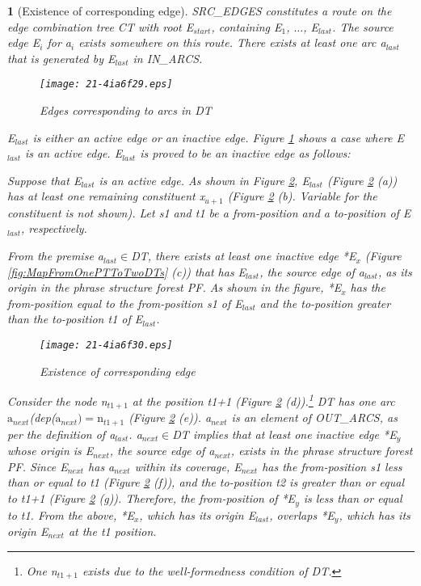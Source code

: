 \documentclass[english]{jnlp_1.4_rep}
\theoremstyle{break}
\theoremstyle{plain}
\newtheorem{lemma}{}[]
\theoremstyle{plain}
\begin{document}
\begin{lemma}[Existence of corresponding edge]
{\noindent
SRC\_EDGES constitutes a route on the edge combination tree CT with
root E$_{start}$, containing E$_1$, ${\ldots}$, E$_{last}$. The source
edge E$_i$ for a$_i$ exists somewhere on this route. There exists at
least one arc a$_{last}$ that is generated by E$_{last}$ in IN\_ARCS.

\begin{figure}[b]
 \begin{center}
\texttt{[image: 21-4ia6f29.eps]}
 \end{center}
\caption{Edges corresponding to arcs in DT}
\label{fig:CorrespondenceDT2Edge}
\end{figure}

E$_{last}$ is either an active edge or an inactive
edge. Figure \ref{fig:CorrespondenceDT2Edge} shows a case where
E$_{last}$ is an active edge. E$_{last}$ is proved to be an inactive
edge as follows:

Suppose that E$_{last}$ is an active edge. As shown in
Figure \ref{fig:ActiveEdgeLast}, E$_{last}$ (Figure \ref{fig:ActiveEdgeLast}
(a)) has at least one remaining constituent x$_{u+1}$
(Figure \ref{fig:ActiveEdgeLast} (b). Variable for the constituent is not
shown). Let s1 and t1 be a from-position and a to-position of
E$_{last}$, respectively.

From the premise a$_{last}{\in}$DT, there exists at least one inactive
edge *E$_x$ (Figure \ref{fig:MapFromOnePTToTwoDTs} (c)) that has
E$_{last}$, the source edge of a$_{last}$, as its origin in the phrase
structure forest PF. As shown in the figure, *E$_x$ has the
from-position equal to the from-position s1 of E$_{last}$ and the
to-position greater than the to-position t1 of E$_{last}$.

\begin{figure}[t]
 \begin{center}
\texttt{[image: 21-4ia6f30.eps]}
 \end{center}
\caption{Existence of corresponding edge}
\label{fig:ActiveEdgeLast}
\end{figure}

Consider the node n$_{t1+1}$ at the position t1+1
(Figure \ref{fig:ActiveEdgeLast} (d)).\footnote{One n$_{t1+1}$ exists due
  to the well-formedness condition of DT.} DT has one arc
\linebreak
$\mathrm{a}_\mathit{next}$(dep($\mathrm{a}_\mathit{next})=\mathrm{n}_{t1+1}$ (Figure \ref{fig:ActiveEdgeLast}
(e)). a$_{next}$ is an element of OUT\_ARCS, as per the definition of
a$_{last}$. a$_{next}{\in}$DT implies that at least one inactive edge
*E$_y$ whose origin is E$_{next}$, the source edge of a$_{next}$,
exists in the phrase structure forest PF. Since E$_{next}$ has
a$_{next}$ within its coverage, E$_{next}$ has the from-position s1
less than or equal to t1 (Figure \ref{fig:ActiveEdgeLast} (f)), and the
to-position t2 is greater than or equal to t1+1
(Figure \ref{fig:ActiveEdgeLast} (g)). Therefore, the from-position of
*E$_y$ is less than or equal to t1. From the above, *E$_x$, which has
its origin E$_{last}$, overlaps *E$_y$, which has its origin E$_{next}$
at the t1 position.

}
\end{lemma}
\end{document}
